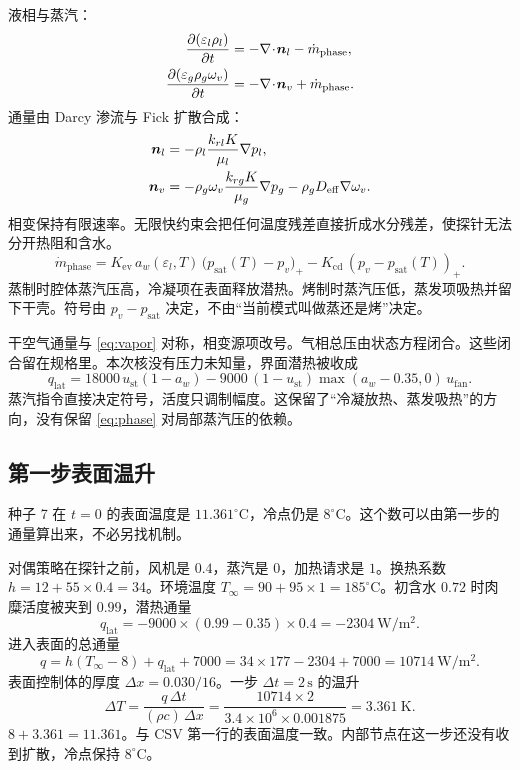 液相与蒸汽：
\begin{align}
\label{eq:liquid}
\frac{\partial(\varepsilon_l\rho_l)}{\partial t}
&=-\nabla\!\cdot\!\bm{n}_l-\dot m_{\mathrm{phase}},\\
\label{eq:vapor}
\frac{\partial(\varepsilon_g\rho_g\omega_v)}{\partial t}
&=-\nabla\!\cdot\!\bm{n}_v+\dot m_{\mathrm{phase}}.
\end{align}
通量由 Darcy 渗流与 Fick 扩散合成：
\begin{align}
\bm{n}_l&=-\rho_l\frac{k_{rl}K}{\mu_l}\nabla p_l,\\
\bm{n}_v&=-\rho_g\omega_v\frac{k_{rg}K}{\mu_g}\nabla p_g
-\rho_g D_{\mathrm{eff}}\nabla\omega_v.
\end{align}
相变保持有限速率。无限快约束会把任何温度残差直接折成水分残差，使探针无法分开热阻和含水。
\begin{equation}
\label{eq:phase}
\dot m_{\mathrm{phase}}
=K_{\mathrm{ev}}\,a_w(\varepsilon_l,T)\,
\big(p_{\mathrm{sat}}(T)-p_v\big)_+
-K_{\mathrm{cd}}\,(p_v-p_{\mathrm{sat}}(T))_+.
\end{equation}
蒸制时腔体蒸汽压高，冷凝项在表面释放潜热。烤制时蒸汽压低，蒸发项吸热并留下干壳。符号由 \(p_v-p_{\mathrm{sat}}\) 决定，不由“当前模式叫做蒸还是烤”决定。

干空气通量与 \eqref{eq:vapor} 对称，相变源项改号。气相总压由状态方程闭合。这些闭合留在规格里。本次核没有压力未知量，界面潜热被收成
\begin{equation}
q_{\mathrm{lat}}=18000\,u_{\mathrm{st}}(1-a_w)-9000\,(1-u_{\mathrm{st}})\max(a_w-0.35,0)\,u_{\mathrm{fan}}.
\end{equation}
蒸汽指令直接决定符号，活度只调制幅度。这保留了“冷凝放热、蒸发吸热”的方向，没有保留 \eqref{eq:phase} 对局部蒸汽压的依赖。

\subsection{第一步表面温升}

种子 7 在 \(t=0\) 的表面温度是 \(11.361^\circ\mathrm{C}\)，冷点仍是 \(8^\circ\mathrm{C}\)。这个数可以由第一步的通量算出来，不必另找机制。

对偶策略在探针之前，风机是 \(0.4\)，蒸汽是 \(0\)，加热请求是 \(1\)。换热系数 \(h=12+55\times 0.4=34\)。环境温度 \(T_\infty=90+95\times 1=185^\circ\mathrm{C}\)。初含水 \(0.72\) 时肉糜活度被夹到 \(0.99\)，潜热通量
\[
q_{\mathrm{lat}}=-9000\times(0.99-0.35)\times 0.4=-2304\ \mathrm{W}/\mathrm{m}^2.
\]
进入表面的总通量
\[
q=h(T_\infty-8)+q_{\mathrm{lat}}+7000=34\times 177-2304+7000=10714\ \mathrm{W}/\mathrm{m}^2.
\]
表面控制体的厚度 \(\Delta x=0.030/16\)。一步 \(\Delta t=2\,\mathrm{s}\) 的温升
\[
\Delta T=\frac{q\,\Delta t}{(\rho c)\,\Delta x}=\frac{10714\times 2}{3.4\times 10^{6}\times 0.001875}=3.361\ \mathrm{K}.
\]
\(8+3.361=11.361\)。与 CSV 第一行的表面温度一致。内部节点在这一步还没有收到扩散，冷点保持 \(8^\circ\mathrm{C}\)。

